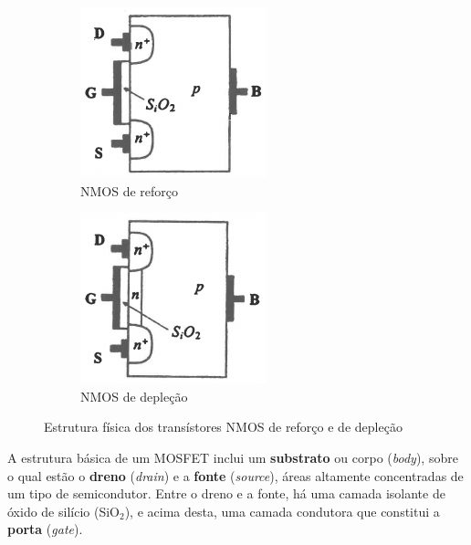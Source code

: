 \begin{figure}[H]
    \begin{subfigure}[b]{0.5\linewidth}
        \centering
        \includegraphics[width = 0.6\linewidth]{img/3/MOSFET/NMOS-enhancement.png}
        \caption{NMOS de reforço}
        \label{fig:NMOS-enhancement}
    \end{subfigure}
    \begin{subfigure}[b]{0.5\linewidth}
        \centering
        \includegraphics[width = 0.6\linewidth]{img/3/MOSFET/NMOS-depletion.png}
        \caption{NMOS de depleção}
        \label{fig:NMOS-depletion}
    \end{subfigure}%
    \caption{Estrutura física dos transístores NMOS de reforço e de depleção}
    \label{fig:NMOS}
\end{figure}

\noindent A estrutura básica de um MOSFET inclui um \textbf{substrato} ou corpo (\textit{body}), sobre o qual estão o \textbf{dreno} (\textit{drain}) e a \textbf{fonte} (\textit{source}), áreas altamente concentradas de um tipo de semicondutor. Entre o dreno e a fonte, há uma camada isolante de óxido de silício (SiO$_{2}$), e acima desta, uma camada condutora que constitui a \textbf{porta} (\textit{gate}). 

